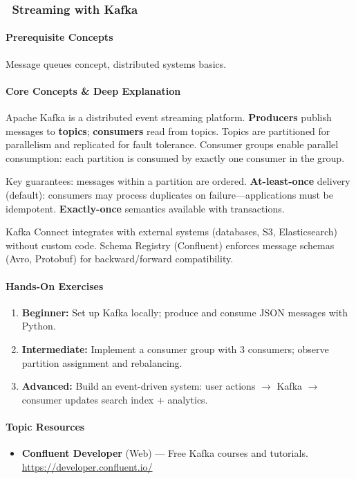 \documentclass[11pt, a4paper, oneside]{report}
\newcommand{\mustmaster}[1]{\subsubsection{\texorpdfstring{\fcolorbox{blue!40!black}{blue!8}{\footnotesize\bfseries\color{blue!40!black} MUST MASTER}~#1}{#1}}}
\newcommand{\arrow}{$\rightarrow$}
\begin{document}
\mustmaster{Streaming with Kafka}

\paragraph{Prerequisite Concepts} Message queues concept, distributed systems basics.

\paragraph{Core Concepts \& Deep Explanation} Apache Kafka is a distributed event streaming platform. \textbf{Producers} publish messages to \textbf{topics}; \textbf{consumers} read from topics. Topics are partitioned for parallelism and replicated for fault tolerance. Consumer groups enable parallel consumption: each partition is consumed by exactly one consumer in the group.

Key guarantees: messages within a partition are ordered. \textbf{At-least-once} delivery (default): consumers may process duplicates on failure---applications must be idempotent. \textbf{Exactly-once} semantics available with transactions.

Kafka Connect integrates with external systems (databases, S3, Elasticsearch) without custom code. Schema Registry (Confluent) enforces message schemas (Avro, Protobuf) for backward/forward compatibility.

\paragraph{Hands-On Exercises}
\begin{enumerate}[leftmargin=*]
\item \textbf{Beginner:} Set up Kafka locally; produce and consume JSON messages with Python.
\item \textbf{Intermediate:} Implement a consumer group with 3 consumers; observe partition assignment and rebalancing.
\item \textbf{Advanced:} Build an event-driven system: user actions \arrow{} Kafka \arrow{} consumer updates search index + analytics.
\end{enumerate}

\paragraph{Topic Resources}
\begin{itemize}[leftmargin=*]
\item \textbf{Confluent Developer} (Web) --- Free Kafka courses and tutorials. \url{https://developer.confluent.io/}
\end{itemize}
\end{document}
